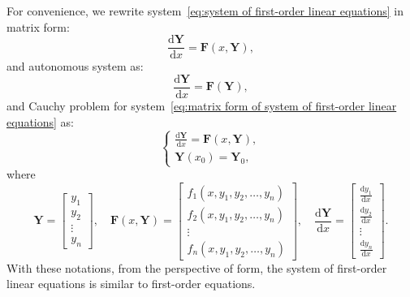 \documentclass[11pt]{../../TexTemplate/elegantbook}
\begin{document}
\vspace{0.7cm}
For convenience, we rewrite system~\eqref{eq:system of first-order linear equations} in matrix form:
\begin{equation}\label{eq:matrix form of system of first-order linear equations}
    \frac{\mathrm{d}\mathbf{Y}}{\mathrm{d}x} = \mathbf{F}(x, \mathbf{Y}),
\end{equation}
and autonomous system as:
\begin{equation}\label{eq:matrix form of autonomous system of first-order linear equations}
    \frac{\mathrm{d}\mathbf{Y}}{\mathrm{d}x} = \mathbf{F}(\mathbf{Y}),
\end{equation}
and Cauchy problem for system~\eqref{eq:matrix form of system of first-order linear equations} as:
\begin{equation}\label{eq:Cauchy problem for system of first-order linear equations}
\begin{cases}
    \frac{\mathrm{d}\mathbf{Y}}{\mathrm{d}x} = \mathbf{F}(x, \mathbf{Y}), \\
    \mathbf{Y}(x_{0}) = \mathbf{Y}_{0},
\end{cases}
\end{equation}
where 
\[
\mathbf{Y} = \begin{bmatrix} y_{1} \\ y_{2} \\ \vdots \\ y_{n} \end{bmatrix}, \quad
\mathbf{F}(x, \mathbf{Y}) = 
\begin{bmatrix} f_{1}(x, y_{1}, y_{2}, \ldots, y_{n}) \\ f_{2}(x, y_{1}, y_{2}, \ldots, y_{n}) \\ 
    \vdots \\ f_{n}(x, y_{1}, y_{2}, \ldots, y_{n}) 
\end{bmatrix},
\quad
\frac{\mathrm{d}\mathbf{Y}}{\mathrm{d}x} = 
\begin{bmatrix} 
    \frac{\mathrm{d}y_{1}}{\mathrm{d}x} \\ \frac{\mathrm{d}y_{2}}{\mathrm{d}x} \\ \vdots \\ \frac{\mathrm{d}y_{n}}{\mathrm{d}x} 
\end{bmatrix}.
\]
With these notations, from the perspective of form, 
the system of first-order linear equations is similar to first-order equations.
\end{document}
